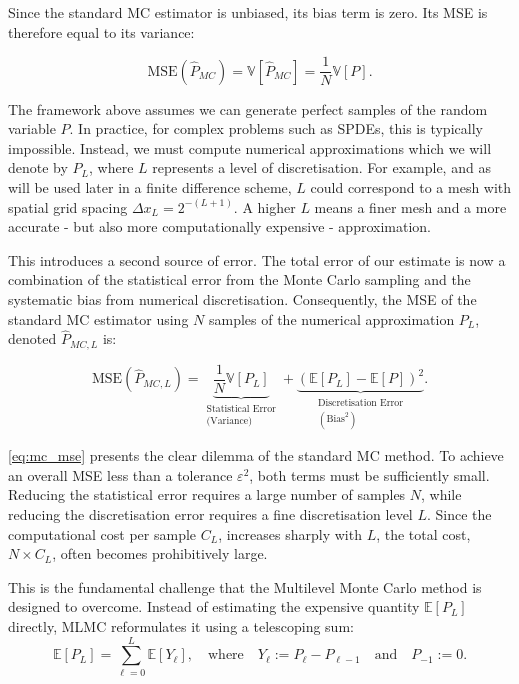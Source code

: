 Since the standard MC estimator is unbiased, its bias term is zero. 
Its MSE is therefore equal to its variance:

\begin{equation*}
    \text{MSE}(\hat{P}_{MC}) = \mathbb{V}[\hat{P}_{MC}] = \frac{1}{N}\mathbb{V}[P].
\end{equation*}

The framework above assumes we can generate perfect samples of the random 
variable $P$. In practice, for complex problems such as SPDEs, this is typically impossible.
Instead, we must compute numerical approximations which we will denote by $P_L$, where $L$ 
represents a level of discretisation. For example, and as will be used later
in a finite difference scheme, $L$ could correspond to a mesh with spatial grid spacing 
$\Delta x_L = 2^{-(L+1)}$. A higher $L$ means a finer mesh and a more accurate - but also more 
computationally expensive - approximation. 

This introduces a second source of error. The total error of our estimate is now a combination 
of the statistical error from the Monte Carlo sampling and the systematic bias from
numerical discretisation. Consequently, the MSE of the standard MC estimator using 
$N$ samples of the numerical approximation $P_L$, denoted $\hat{P}_{MC, L}$ is:

\begin{equation}\label{eq:mc_mse}
    \text{MSE}(\hat{P}_{MC,L}) = \underbrace{\frac{1}{N}\mathbb{V}[P_L]}_{\substack{\text{Statistical Error} \\ \text{(Variance)}}} + 
    \underbrace{(\mathbb{E}[P_L] - \mathbb{E}[P])^2}_{\substack{\text{Discretisation Error} \\ (\text{Bias}^2)}}.
\end{equation}

\eqref{eq:mc_mse} presents the clear dilemma of the standard MC method. To achieve an overall
MSE less than a tolerance  $\varepsilon^2$, both terms must be sufficiently small. 
Reducing the statistical error requires a large number of samples $N$, while 
reducing the discretisation error requires a fine discretisation level $L$.
Since the computational cost per sample $C_L$, increases sharply with $L$, the total 
cost, $N \times C_L$, often becomes prohibitively large. 

This is the fundamental challenge that the Multilevel Monte Carlo method is designed to overcome. 
Instead of estimating the expensive quantity $\mathbb{E}[P_L]$ directly, MLMC reformulates it 
using a telescoping sum:
\begin{equation*}
    \mathbb{E}[P_L] = \sum_{\ell=0}^L \mathbb{E}[Y_\ell], \quad \text{where} \quad 
    Y_\ell := P_\ell - P_{\ell-1} \quad \text{and} \quad P_{-1} := 0.
\end{equation*}

